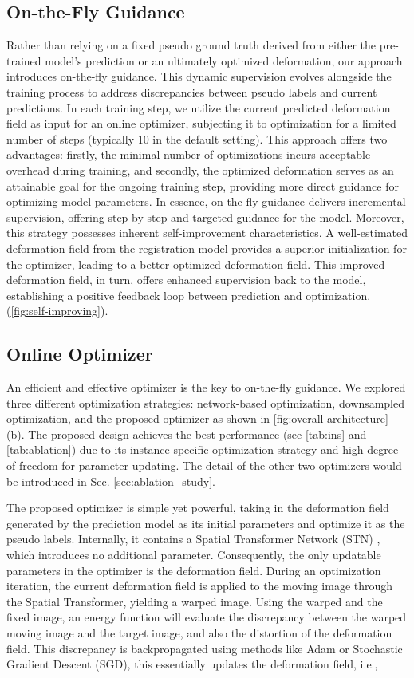 \documentclass[10pt,twocolumn,letterpaper]{article}
\begin{document}
\subsection{On-the-Fly Guidance}\label{method:Tra}
Rather than relying on a fixed pseudo ground truth derived from either the pre-trained model's prediction or an ultimately optimized deformation, our approach introduces on-the-fly guidance. This dynamic supervision evolves alongside the training process to address discrepancies between pseudo labels and current predictions. In each training step, we utilize the current predicted deformation field as input for an online optimizer, subjecting it to optimization for a limited number of steps (typically 10 in the default setting). This approach offers two advantages: firstly, the minimal number of optimizations incurs acceptable overhead during training, and secondly, the optimized deformation serves as an attainable goal for the ongoing training step, providing more direct guidance for optimizing model parameters. In essence, on-the-fly guidance delivers incremental supervision, offering step-by-step and targeted guidance for the model. Moreover, this strategy possesses inherent self-improvement characteristics. A well-estimated deformation field from the registration model provides a superior initialization for the optimizer, leading to a better-optimized deformation field. This improved deformation field, in turn, offers enhanced supervision back to the model, establishing a positive feedback loop between prediction and optimization. (\cref{fig:self-improving}).

\subsection{Online Optimizer}\label{method:Opt}
An efficient and effective optimizer is the key to on-the-fly guidance. We explored three different optimization strategies: network-based optimization, downsampled optimization, and the proposed optimizer as shown in \cref{fig:overall architecture} (b). The proposed design achieves the best performance (see \cref{tab:ins} and \cref{tab:ablation}) due to its instance-specific optimization strategy and high degree of freedom for parameter updating. The detail of the other two optimizers would be introduced in Sec. \ref{sec:ablation_study}. 

The proposed optimizer is simple yet powerful, taking in the deformation field generated by the prediction model as its initial parameters and optimize it as the pseudo labels. Internally, it contains a Spatial Transformer Network (STN) \cite{STN}, which introduces no additional parameter. Consequently, the only updatable parameters in the optimizer is the deformation field. During an optimization iteration, the current deformation field is applied to the moving image through the Spatial Transformer, yielding a warped image. Using the warped and the fixed image, an energy function will evaluate the discrepancy between the warped moving image and the target image, and also the distortion of the deformation field. This discrepancy is backpropagated using methods like Adam \cite{kingma2017adam} or Stochastic Gradient Descent (SGD), this essentially updates the deformation field, i.e.,
\end{document}
